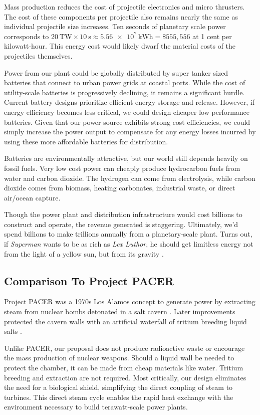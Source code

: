 \documentclass{article}
\begin{document}
Mass production reduces the cost of projectile electronics and micro thrusters. The cost of these components per projectile also remains nearly the same as individual projectile size increases.  Ten seconds of planetary scale power corresponds to $\SI{20}{\tera\watt} \times \SI{10}{\second} \approx \SI{5.56e7}{\kilo\watt\hour} = \$555,556$ at 1 cent per kilowatt-hour.  This energy cost would likely dwarf the material costs of the projectiles themselves.      

Power from our plant could be globally distributed by super tanker sized batteries that connect to urban power grids at coastal ports.  While the cost of utility-scale batteries is progressively declining, it remains a significant hurdle. Current battery designs prioritize efficient energy storage and release. However, if energy efficiency becomes less critical, we could design cheaper low performance batteries. Given that our power source exhibits strong cost efficiencies, we could simply increase the power output to compensate for any energy losses incurred by using these more affordable batteries for distribution. 

Batteries are environmentally attractive, but our world still depends heavily on fossil fuels.  Very low cost power can cheaply produce hydrocarbon fuels from water and carbon dioxide.  The hydrogen can come from electrolysis, while carbon dioxide comes from biomass, heating carbonates, industrial waste, or direct air/ocean capture.

Though the power plant and distribution infrastructure would cost billions to construct and operate, the revenue generated is staggering. Ultimately, we'd spend billions to make trillions annually from a planetary-scale plant.  Turns out, if  \textit{Superman} wants to be as rich as \textit{Lex Luthor}, he should get limitless energy not from the light of a yellow sun, but from its gravity \cite{superman2025}.

\subsection{Comparison To Project PACER}
Project PACER was a 1970s Los Alamos concept to generate power by extracting steam from nuclear bombs detonated in a salt cavern \cite{pacer_1975}.   Later improvements protected the cavern walls with an artificial waterfall of tritium breeding liquid salts \cite{pacer_revisited}.  

Unlike PACER, our proposal does not produce radioactive waste or encourage the mass production of nuclear weapons.   Should a liquid wall be needed to protect the chamber, it can be made from cheap materials like water.  Tritium breeding and extraction are not required.   Most critically, our design eliminates the need for a biological shield, simplifying the direct coupling of steam to turbines. This direct steam cycle enables the rapid heat exchange with the environment necessary to build terawatt-scale power plants.
\end{document}
